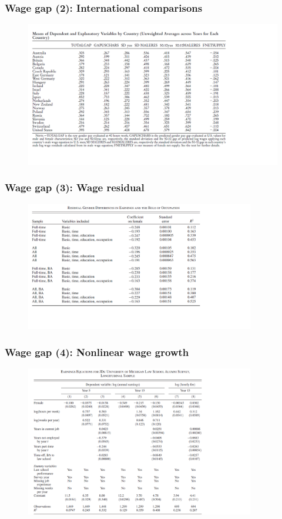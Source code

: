 \documentclass{beamer}
\newcommand{\1}{\mathbb{1}}
\begin{document}
\begin{frame}\frametitle{Wage gap (2): International comparisons}
\begin{figure}
\includegraphics[width = 12cm]{plot/wagegapc}
\end{figure}
\end{frame}

\begin{frame}\frametitle{Wage gap (3): Wage residual}
\begin{figure}
\includegraphics[width = 10cm]{plot/reswage}
\end{figure}
\end{frame}

\begin{frame}\frametitle{Wage gap (4): Nonlinear wage growth}
\begin{figure}
\includegraphics[width = 10cm]{plot/lawwage}
\end{figure}
\end{frame}
\end{document}
